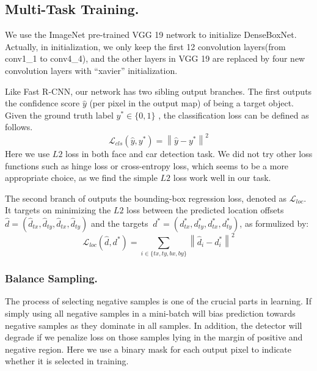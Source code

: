\subsection{Multi-Task Training.} 
\label{sec:training} 
We use the ImageNet pre-trained VGG 19 network to initialize DenseBoxNet. Actually, in initialization, we only keep the first 12 convolution layers(from conv1\_1 to conv4\_4), and the other layers in VGG 19 are replaced by four new convolution layers with “xavier” initialization. 

Like Fast R-CNN, our network has two sibling output branches.  The first outputs the confidence score $ \hat{y}$ (per pixel in the output map) of being a target object.  Given the ground truth label $y^* \in \{0,1 \}$ , the classification loss can be defined as follows. 
	\begin{equation}\label{eq:eq_cls_loss}
	\mathcal{L} _{cls}(\hat{y},y^*) = \left \| \hat{y} - y^* \right \| ^2
	\end{equation}
Here we use $L2$ loss in both face and car detection task. We did not try other loss functions such as hinge loss or cross-entropy loss, which seems to be a more appropriate choice, as we find the simple $L2$ loss work well in our task. 

The second branch of outputs the bounding-box regression loss, denoted as $\mathcal{L} _{loc}$.  It targets on minimizing the $L2$ loss between the predicted location offsets $\hat{d} = (\hat{d}_{tx}, \hat{d}_{ty}, \hat{d}_{tx}, \hat{d}_{ty})$ and the targets  $\ d^* = (d^{*}_{tx},  d^{*}_{ty},  d^{*}_{tx}, d^{*}_{ty})$, as formulized by:
	\begin{equation}\label{eq:eq_loc_loss}
	\mathcal{L} _{loc}(\hat{d},d^*) =  \sum_{i \in \{ tx, ty,bx,by \} }  \left \| \hat{d}_{i} - d^*_{i} \right \| ^2
	\end{equation}

 \subsubsection{Balance Sampling.} 
The process of selecting negative samples is one of the crucial parts in learning. If simply using all negative samples in a mini-batch will bias prediction towards negative samples as they dominate in all samples.  In addition, the detector will degrade if we penalize loss on those samples lying in the margin of positive and negative region.  Here we use a binary mask for each output pixel to indicate whether it is selected in training. 

